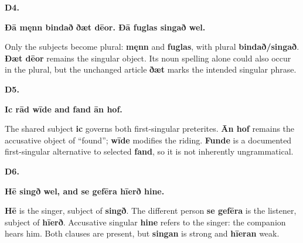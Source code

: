 \par\begin{minipage}{\linewidth}\raggedright
\textbf{D4.}

\textbf{Ðā męnn bindað ðæt dēor. Ðā fuglas singað wel.}

Only the subjects become plural: \textbf{męnn} and \textbf{fuglas}, with plural \textbf{bindað/\allowbreak{}singað}. \textbf{Ðæt dēor} remains the singular object. Its noun spelling alone could also occur in the plural, but the unchanged article \textbf{ðæt} marks the intended singular phrase.

\end{minipage}\par\addvspace{4pt}

\par\begin{minipage}{\linewidth}\raggedright
\textbf{D5.}

\textbf{Ic rād wīde and fand ān hof.}

The shared subject \textbf{ic} governs both first-singular preterites. \textbf{Ān hof} remains the accusative object of “found”; \textbf{wīde} modifies the riding. \textbf{Funde} is a documented first-singular alternative to selected \textbf{fand}, so it is not inherently ungrammatical.

\end{minipage}\par\addvspace{4pt}

\par\begin{minipage}{\linewidth}\raggedright
\textbf{D6.}

\textbf{Hē singð wel, and se gefēra hīerð hine.}

\textbf{Hē} is the singer, subject of \textbf{singð}. The different person \textbf{se gefēra} is the listener, subject of \textbf{hīerð}. Accusative singular \textbf{hine} refers to the singer: the companion hears him. Both clauses are present, but \textbf{singan} is strong and \textbf{hīeran} weak.

\end{minipage}\par\addvspace{4pt}

